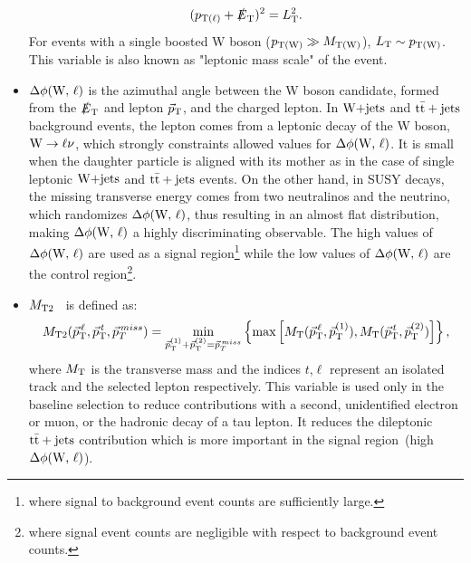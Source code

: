 \begin{itemize}
\begin{eqnarray}
{(p_{\rm T(\ell)}+\ensuremath{\slashed{E}_{\rm T}})^2} = {L_{\rm T}^2}.
  \label{eq:LTderive}
\end{eqnarray}
For events with a single boosted W boson ($p_{\rm T(W)}\gg M_{\rm T(W)}$), $L_{\rm T} \sim p_{\rm T(W)}$. This variable is also known as "leptonic mass scale" of the event.
\item {\boldmath $\Delta \phi\textrm{(W, }\ell)$} is the azimuthal angle between the W boson candidate, formed from the $\slashed{E}_{\rm T}$ and lepton $\vec{p}_{\rm T}$, and the charged lepton. In $\textrm{W+jets}$ and ${\rm t\bar{t}+jets}$ background events, the lepton comes from a leptonic decay of the W boson, ${\rm W\rightarrow\ell\nu}$, which strongly constraints allowed values for $\Delta \phi\textrm{(W, }\ell)$. It is small when the daughter particle is aligned with its mother as in the case of single leptonic $\textrm{W+jets}$ and ${\rm t\bar{t}+jets}$ events.
On the other hand, in SUSY decays, the missing transverse energy comes from two neutralinos and the neutrino, which randomizes $\Delta \phi\textrm{(W, }\ell)$, thus resulting in an almost flat distribution, making $\Delta \phi\textrm{(W, }\ell)$ a highly discriminating observable.
The high values of $\Delta \phi\textrm{(W, }\ell)$ are used as a signal region\footnote{where signal to background event counts are sufficiently large.} while the low values of $\Delta \phi\textrm{(W, }\ell)$ are the control region\footnote{where signal event counts are negligible with respect to background event counts.}.
\item {\boldmath $M_\mathrm{T2}$}~\cite{MT2} is defined as:
\begin{eqnarray}
  M_\mathrm{T2}(\vec{p}_{\text T}^{\,\ell},\vec{p}_{\text T}^{\,t},\vec{p}_T^{\,miss}) =
  \min\limits_{\vec{p}_{\text T}^{(1)}+\vec{p}_{\text T}^{(2)} = \vec{p}_T^{\,miss}} \left\{
  \max \left[ M_\mathrm{T}(\vec{p}_{\text T}^{\,\ell}, \vec{p}_{\text T}^{(1)}), 
              M_\mathrm{T}(\vec{p}_{\text T}^{\,t},\vec{p}_{\text T}^{(2)})\right] \right\},
  \label{eq:MT2}
\end{eqnarray}
where $M_\mathrm{T}$ is the transverse mass and the indices $t$,$\ell$ represent an isolated track and the selected lepton respectively. This variable is used only in the baseline selection to reduce contributions with a second, unidentified electron or muon, or the hadronic decay of a tau lepton. It reduces the dileptonic ${\rm t\bar{t}+jets}$ contribution which is more important in the signal region~(high  $\Delta \phi\textrm{(W, }\ell)$). 
\end{itemize}
